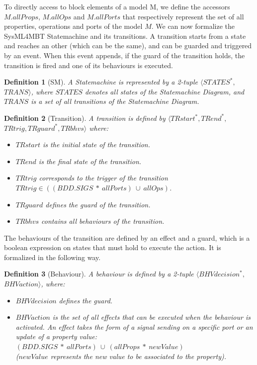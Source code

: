 \documentclass{llncs}
\newtheorem{de}{Definition}
\begin{document}
To directly access to block elements of a model M, we
define the accessors $M.allProps$, $M.allOps$ and $M.allPorts$ that
respectively represent the set of all properties, operations and
ports of the model $M$. We can now formalize the SysML4MBT
Statemachine and its transitions. 
A transition starts from a state and reaches an other (which can be the
same), and can be guarded and triggered by an event. When this event
appends, if the guard of the transition holds, the transition is
fired and one of its behaviours is executed. 

\begin{de}[SM]
A Statemachine is represented by a 2-tuple $\langle STATES^*,$
\linebreak $TRANS \rangle$, where $STATES$ denotes all states of the
Statemachine Diagram, and $TRANS$ is a set of all transitions of the
Statemachine Diagram. 
\end{de}

\begin{de}[Transition]
A transition is defined by $\langle TRstart^*,TRend^*,$ \linebreak $TRtrig,TRguard^*,TRbhvs \rangle$
where:\vspace*{-.25cm}
\begin{itemize}
  \item $TRstart$ is the initial state of the transition.
  \item $TRend$ is the final state of the transition.
  \item $TRtrig$ corresponds to the trigger of the transition \\
  $TRtrig \in ((BDD.SIGS~*~allPorts)~\cup~allOps)$.
  \item $TRguard$ defines the guard of the transition.
  \item $TRbhvs$ contains all behaviours of the transition. 
\end{itemize}
\end{de}

The behaviours of the transition are defined by an effect and
a guard, which is a boolean expression on states that must hold to
execute the action. It is formalized in the following way. 

\begin{de}[Behaviour]
A behaviour is defined by a 2-tuple $\langle BHVdecision^*,$ \linebreak $
BHVaction \rangle$, where:\vspace*{-.25cm}
\begin{itemize}
  \item $BHVdecision$ defines the guard. 
  \item $BHVaction$ is the set of all effects that can be executed
    when the behaviour is activated. An effect takes the form of a
    signal sending on a specific port or an update of a property value:\\
  $(BDD.SIGS~*~allPorts)~\cup~(allProps~*~newValue)$ \\
  ($newValue$ represents the new value to be associated to the property). 
\end{itemize}
\end{de}
\end{document}
